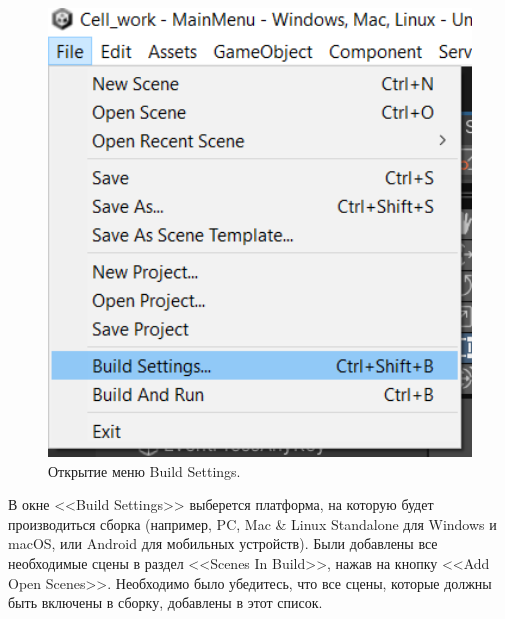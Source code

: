 \begin{figure}[H]
	\centering
	\includegraphics[width=1\textwidth]{images/build1.png}  
	\caption{Открытие меню Build Settings.}
	\label{fig5}
\end{figure}

В окне <<Build Settings>> выберется платформа, на которую будет производиться сборка (например, PC, Mac \& Linux Standalone для Windows и macOS, или Android для мобильных устройств). Были добавлены все необходимые сцены в раздел <<Scenes In Build>>, нажав на кнопку <<Add Open Scenes>>. Необходимо было убедитесь, что все сцены, которые должны быть включены в сборку, добавлены в этот список.

